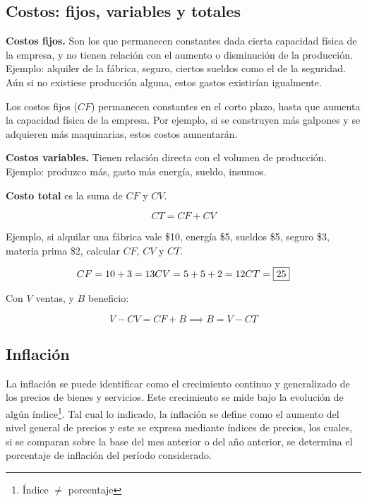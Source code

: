 \subsection{Costos: fijos, variables y totales}

\textbf{Costos fijos.}
Son los que permanecen constantes dada cierta capacidad física de la empresa,
y no tienen relación con el aumento o disminución de la producción.
Ejemplo:
alquiler de la fábrica,
seguro,
ciertos sueldos como el de la seguridad.
Aún si no existiese producción alguna,
estos gastos existirían igualmente.

Los costos fijos (\(CF\)) permanecen constantes en el corto plazo,
hasta que aumenta la capacidad física de la empresa.
Por ejemplo, 
si se construyen más galpones y se adquieren más maquinarias,
estos costos aumentarán.

\textbf{Costos variables.}
Tienen relación directa con el volumen de producción.
Ejemplo: produzco más, gasto más energía, sueldo, insumos.

\textbf{Costo total} es la suma de \(CF\) y \(CV\).

\begin{equation*}
    CT = CF + CV
\end{equation*}

Ejemplo, si alquilar una fábrica vale \$10,
energía \$5, sueldos \$5, seguro \$3, materia prima \$2,
calcular \(CF\), \(CV\) y \(CT\).

\begin{equation*}
    CF = 10 + 3 = 13 \\
    CV = 5 + 5 + 2 = 12 \\
    CT = \boxed{25}
\end{equation*}

Con \(V\) ventas, y \(B\) beneficio:

\begin{equation*}
    V - CV = CF + B \implies B = V - CT
\end{equation*}

\subsection{Inflación}

La inflación se puede identificar como el crecimiento continuo y generalizado de 
los precios de bienes y servicios.
Este crecimiento se mide bajo la evolución de algún índice\footnote{Índice \(\neq\) porcentaje}.
Tal cual lo indicado, 
la inflación se define como el aumento del nivel general de precios
y este se expresa mediante índices de precios, 
los cuales,
si se comparan sobre la base del mes anterior o del año anterior,
se determina el porcentaje de inflación del período considerado.

